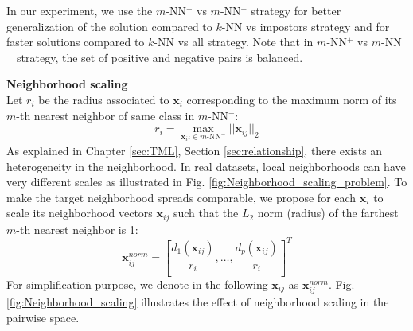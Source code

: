 In our experiment, we use the $m$-NN$^+$ vs $m$-NN$^-$ strategy for better generalization of the solution compared to $k$-NN vs impostors strategy and for faster solutions compared to $k$-NN vs all strategy. Note that in $m$-NN$^+$ vs $m$-NN$^-$ strategy, the set of positive and negative pairs is balanced.


\noindent \textbf{Neighborhood scaling} \\
Let $r_i$ be the radius associated to $\textbf{x}_i$ corresponding to the maximum norm of its $m$-th nearest neighbor of same class in $m$-NN$^-$:
\begin{equation}
	r_i = \max_{\textbf{x}_{ij} \in \text{$m$-NN$^-$}} ||\textbf{x}_{ij}||_2
\end{equation}
As explained in Chapter \ref{sec:TML}, Section \ref{sec:relationship}, there exists an heterogeneity in the neighborhood. In real datasets, local neighborhoods can have very different scales as illustrated in Fig. \ref{fig:Neighborhood_scaling_problem}. To make the target neighborhood spreads comparable, we propose for each $\textbf{x}_i$ to scale its neighborhood vectors $\textbf{x}_{ij}$ such that the $L_2$ norm (radius) of the farthest $m$-th nearest neighbor is 1:
\begin{equation}
	\textbf{x}_{ij}^{norm} = \left[ \frac{d_1(\textbf{x}_{ij})}{r_i}, \ldots, \frac{d_p(\textbf{x}_{ij})}{r_i}\right] ^T
\end{equation}
For simplification purpose, we denote in the following $\textbf{x}_{ij}$ as $\textbf{x}_{ij}^{norm}$. Fig. \ref{fig:Neighborhood_scaling} illustrates the effect of neighborhood scaling in the pairwise space.
